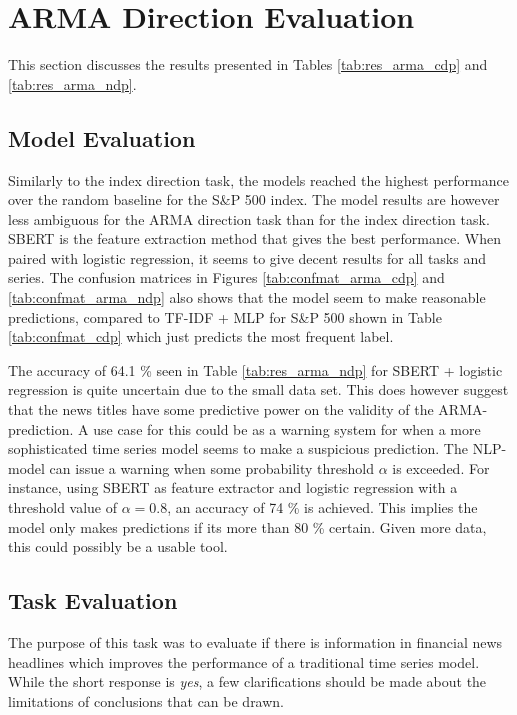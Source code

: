 \section{ARMA Direction Evaluation}\label{sec:eval_arma}

This section discusses the results presented in Tables \ref{tab:res_arma_cdp} and \ref{tab:res_arma_ndp}.

\subsection{Model Evaluation}

Similarly to the index direction task, the models reached the highest performance over the random baseline for the S\&P 500 index. The model results are however less ambiguous for the ARMA direction task than for the index direction task. SBERT is the feature extraction method that gives the best performance. When paired with logistic regression, it seems to give decent results for all tasks and series. The confusion matrices in Figures \ref{tab:confmat_arma_cdp} and \ref{tab:confmat_arma_ndp} also shows that the model seem to make reasonable predictions, compared to TF-IDF + MLP for S\&P 500 shown in Table \ref{tab:confmat_cdp} which just predicts the most frequent label.

The accuracy of 64.1 \% seen in Table \ref{tab:res_arma_ndp} for SBERT + logistic regression is quite uncertain due to the small data set. This does however suggest that the news titles have some predictive power on the validity of the ARMA-prediction. A use case for this could be as a warning system for when a more sophisticated time series model seems to make a suspicious prediction. The NLP-model can issue a warning when some probability threshold $\alpha$ is exceeded. For instance, using SBERT as feature extractor and logistic regression with a threshold value of $\alpha = 0.8$, an accuracy of 74 \% is achieved. This implies the model only makes predictions if its more than 80 \% certain. Given more data, this could possibly be a usable tool. 

\subsection{Task Evaluation}

The purpose of this task was to evaluate if there is information in financial news headlines which improves the performance of a traditional time series model. While the short response is \emph{yes}, a few clarifications should be made about the limitations of conclusions that can be drawn. 

